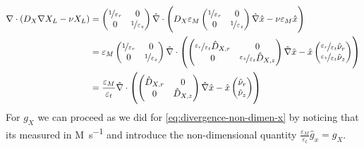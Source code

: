 \documentclass[a4paper,doc,11pt]{article}
\begin{document}
\begin{align}
    \nabla \cdot ( D_X \nabla X_L - \nu X_L  )
    &=
    \begin{pmatrix}
        \nicefrac{1}{\varepsilon_r} & 0 \\
        0 & \nicefrac{1}{\varepsilon_z}
    \end{pmatrix}
    \hat{\nabla}
    \cdot
    \left( 
        D_X
        \varepsilon_M
        \begin{pmatrix}
        \nicefrac{1}{\varepsilon_r} & 0 \\
        0 & \nicefrac{1}{\varepsilon_z}
    \end{pmatrix}
    \hat{\nabla} \hat{x} - \nu \varepsilon_M \hat{x}
    \right)
    \notag
    \\
    &= \varepsilon_M
    \begin{pmatrix}
        \nicefrac{1}{\varepsilon_r} & 0 \\
        0 & \nicefrac{1}{\varepsilon_z}
    \end{pmatrix}
    \hat{\nabla}
    \cdot
    \left( 
        \begin{pmatrix}
         \nicefrac{\varepsilon_r}{\varepsilon_t} \hat{D}_{X,r} & 0 
         \\
        0 &  \nicefrac{\varepsilon_z}{\varepsilon_t} \hat{D}_{X,z}
    \end{pmatrix}
    \hat{\nabla} \hat{x} - \hat{x}
    \begin{pmatrix}
         \nicefrac{\varepsilon_r}{\varepsilon_t} \hat{\nu}_{r} 
         \\
        \nicefrac{\varepsilon_z}{\varepsilon_t} \hat{\nu}_{z}
    \end{pmatrix}
    \right)
    \notag
    \\
    &= \frac{\varepsilon_M}{\varepsilon_t}
    \hat{\nabla}
    \cdot
    \left( 
        \begin{pmatrix}
         \hat{D}_{X,r} & 0 
         \\
        0 &  \hat{D}_{X,z}
    \end{pmatrix}
    \hat{\nabla} \hat{x} - \hat{x}
    \begin{pmatrix}
         \hat{\nu}_{r} 
         \\
        \hat{\nu}_{z}
    \end{pmatrix}
    \right)
    \label{eq:divergence-non-dimen-x}
\end{align}
For \(g_X\) we can proceed as we did for \eqref{eq:divergence-non-dimen-x} by noticing that its measured in \si{M.s^{-1}} and introduce the non-dimensional quantity \( \frac{\varepsilon_M}{\varepsilon_t}\hat{g}_{x} = g_X\).
\end{document}
